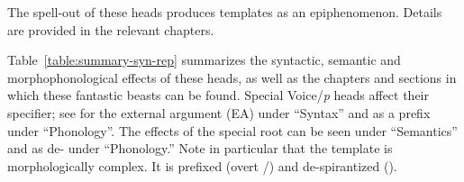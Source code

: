 \begin{exe}
\begin{xlist}
\begin{exe}
\begin{exe}
\begin{exe}
\begin{exe}
\begin{xlist}
\begin{exe}
\begin{xlist}
\begin{xlist}
\begin{xlist}
\begin{exe}
\begin{xlist}
\begin{exe}
\begin{exe}
\begin{xlist}
\begin{exe}
\begin{xlist}
\begin{exe}
\begin{exe}
\begin{xlist}
\begin{exe}
\begin{xlist}
\begin{exe}
\begin{xlist}
\begin{exe}
\begin{exe}
\begin{xlist}
\begin{exe}
\begin{exe}
\begin{xlist}
\begin{exe}
\begin{xlist}
\begin{exe}
\begin{xlist}
\begin{xlist}
\begin{exe}
\begin{exe}
\begin{xlist}
\begin{exe}
\begin{xlist}
\begin{exe}
\begin{xlist}
\begin{exe}
\begin{xlist}
\begin{exe}
\begin{exe}
\begin{exe}
\begin{exe}
\begin{exe}
\begin{xlist}
\begin{exe}
\begin{exe}
\begin{xlist}
The spell-out of these heads produces templates as an epiphenomenon. Details are provided in the relevant chapters.

Table~\ref{table:summary-syn-rep} summarizes the syntactic, semantic and morphophonological effects of these heads, as well as the chapters and sections in which these fantastic beasts can be found. Special Voice/\emph{p} heads affect their specifier; see for the external argument (EA) under ``Syntax'' and as a prefix under ``Phonology''. The effects of the special root {\va} can be seen under ``Semantics'' and as de- under ``Phonology.'' Note in particular that the {\thit} template is morphologically complex. It is prefixed (overt {\vz}/{\pz}) and de-spirantized ({\va}).
\begin{table}
\end{table}
\end{xlist}
\end{exe}
\end{exe}
\end{xlist}
\end{exe}
\end{exe}
\end{exe}
\end{exe}
\end{exe}
\end{xlist}
\end{exe}
\end{xlist}
\end{exe}
\end{xlist}
\end{exe}
\end{xlist}
\end{exe}
\end{exe}
\end{xlist}
\end{xlist}
\end{exe}
\end{xlist}
\end{exe}
\end{xlist}
\end{exe}
\end{exe}
\end{xlist}
\end{exe}
\end{exe}
\end{xlist}
\end{exe}
\end{xlist}
\end{exe}
\end{xlist}
\end{exe}
\end{exe}
\end{xlist}
\end{exe}
\end{xlist}
\end{exe}
\end{exe}
\end{xlist}
\end{exe}
\end{xlist}
\end{xlist}
\end{xlist}
\end{exe}
\end{xlist}
\end{exe}
\end{exe}
\end{exe}
\end{exe}
\end{xlist}
\end{exe}
